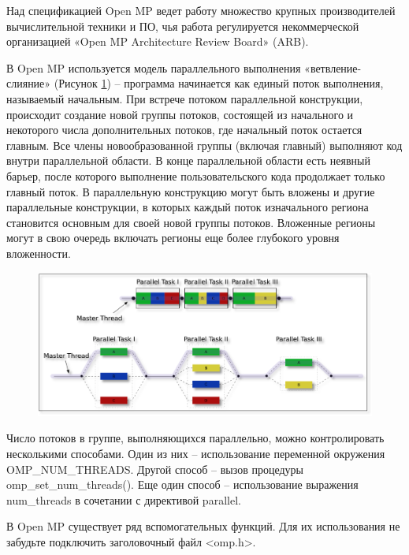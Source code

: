 \documentclass[a4paper, 14pt]{extreport}
\begin{document}
	Над спецификацией Open MP ведет работу множество крупных производителей вычислительной техники и ПО, чья работа регулируется некоммерческой организацией «Open MP Architecture Review Board» (ARB).
	
	В Open MP используется модель параллельного выполнения «ветвление-слияние» (Рисунок \ref{i1_3}) – программа начинается как единый поток выполнения, называемый начальным. При встрече потоком параллельной конструкции, происходит создание новой группы потоков, состоящей из начального и некоторого числа дополнительных потоков, где начальный поток остается главным. Все члены новообразованной группы (включая главный) выполняют код внутри параллельной области. В конце параллельной области есть неявный барьер, после которого выполнение пользовательского кода продолжает только главный поток. В параллельную конструкцию могут быть вложены и другие параллельные конструкции, в которых каждый поток изначального региона становится основным для своей новой группы потоков. Вложенные регионы могут в свою очередь включать регионы еще более глубокого уровня вложенности.
	\begin{figure}[h]
		\begin{center}
			\includegraphics[width=\linewidth]{openmp}
			\label{i1_3}
		\end{center}
	\end{figure}
	Число потоков в группе, выполняющихся параллельно, можно контролировать несколькими способами. Один из них – использование переменной окружения OMP\_NUM\_THREADS. Другой способ – вызов процедуры omp\_set\_num\_threads(). Еще один способ – использование выражения num\_threads в сочетании с директивой parallel.
	
	В Open MP существует ряд вспомогательных функций. Для их использования не забудьте подключить заголовочный файл <omp.h>.
	
\end{document}
